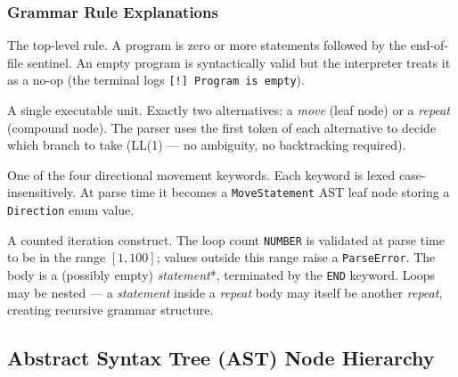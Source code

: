 \documentclass[12pt,a4paper]{article}
\newcommand{\token}[1]{\textcolor{accent}{\texttt{#1}}}
\newcommand{\nonterminal}[1]{\textit{\textcolor{primary}{#1}}}
\begin{document}
\subsubsection{Grammar Rule Explanations}

\begin{description}[leftmargin=2em, style=nextline]
  \item[\nonterminal{program}]
    The top-level rule. A program is zero or more statements followed by the end-of-file sentinel. An empty program is syntactically valid but the interpreter treats it as a no-op (the terminal logs \texttt{[!] Program is empty}).

  \item[\nonterminal{statement}]
    A single executable unit. Exactly two alternatives: a \nonterminal{move} (leaf node) or a \nonterminal{repeat} (compound node). The parser uses the first token of each alternative to decide which branch to take (LL(1) — no ambiguity, no backtracking required).

  \item[\nonterminal{move}]
    One of the four directional movement keywords. Each keyword is lexed case-insensitively. At parse time it becomes a \texttt{MoveStatement} AST leaf node storing a \texttt{Direction} enum value.

  \item[\nonterminal{repeat}]
    A counted iteration construct. The loop count \token{NUMBER} is validated at parse time to be in the range $[1, 100]$; values outside this range raise a \texttt{ParseError}. The body is a (possibly empty) \nonterminal{statement}*, terminated by the \token{END} keyword. Loops may be nested — a \nonterminal{statement} inside a \nonterminal{repeat} body may itself be another \nonterminal{repeat}, creating recursive grammar structure.
\end{description}

\subsection{Abstract Syntax Tree (AST) Node Hierarchy}
\end{document}
